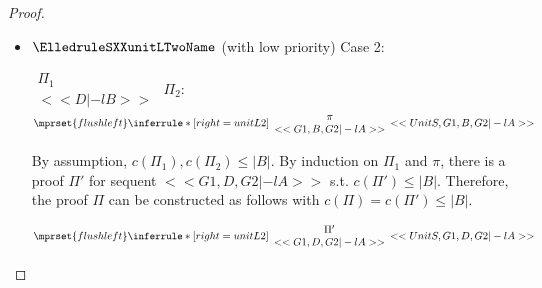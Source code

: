 \begin{proof}
\begin{enumerate}
\begin{itemize}
  \item $\ElledruleSXXunitLTwoName$ (with low priority) Case 2:
    \begin{center}
      \scriptsize
      \begin{math}
        \begin{array}{c}
          \Pi_1 \\
          {<<D |-l B>>}
        \end{array}
      \end{math}
      \qquad\qquad
      $\Pi_2$:
      \begin{math}
        $$\mprset{flushleft}
        \inferrule* [right={\tiny unitL2}] {
          {
            \begin{array}{c}
              \pi \\
              {<<G1, B, G2 |-l A>>}
            \end{array}
          }
        }{<<UnitS, G1, B, G2 |-l A>>}
      \end{math}
    \end{center}
    By assumption, $c(\Pi_1),c(\Pi_2)\leq |B|$. By induction on $\Pi_1$ and $\pi$, there is a
    proof $\Pi'$ for sequent $<<G1, D, G2 |-l A>>$ s.t. $c(\Pi') \leq |B|$. Therefore, the
    proof $\Pi$ can be constructed as follows with $c(\Pi) = c(\Pi') \leq |B|$.
    \begin{center}
      \scriptsize
      \begin{math}
        $$\mprset{flushleft}
        \inferrule* [right={\tiny unitL2}] {
          {
            \begin{array}{c}
              \Pi' \\
              {<<G1, D, G2 |-l A>>}
            \end{array}
          }
        }{<<UnitS, G1, D, G2 |-l A>>}
      \end{math}
    \end{center}


\end{itemize}
\end{enumerate}
\end{proof}
